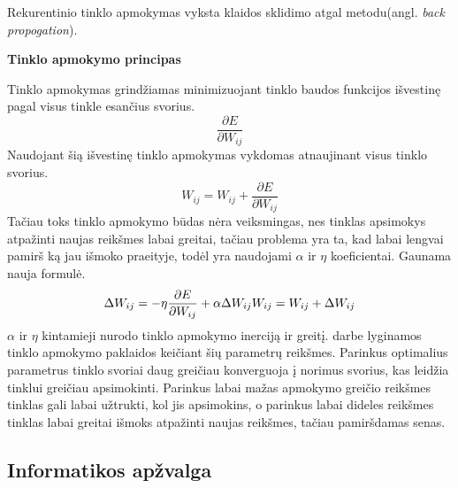 Rekurentinio tinklo apmokymas vyksta klaidos sklidimo atgal metodu(angl. \textit{back propogation}).

\textbf{Tinklo apmokymo principas}

Tinklo apmokymas grindžiamas minimizuojant tinklo baudos funkcijos išvestinę pagal visus tinkle esančius svorius.
    \begin{equation*}
      \frac{\partial E}{\partial W_{ij}}
    \end{equation*}
Naudojant šią išvestinę tinklo apmokymas vykdomas atnaujinant visus tinklo svorius.
    \begin{equation*}
      W_{ij} = W_{ij} + \frac{\partial E}{\partial W_{ij}}
    \end{equation*}
Tačiau toks tinklo apmokymo būdas nėra veiksmingas, nes tinklas apsimokys atpažinti naujas reikšmes labai greitai, tačiau problema yra ta, kad labai lengvai pamirš ką jau išmoko praeityje, todėl yra naudojami $\alpha$ ir $\eta$ koeficientai. Gaunama nauja formulė.
\begin{equation*}
  \Delta W_{ij} =-\eta\frac{\partial E}{\partial W_{ij}}+\alpha \Delta W_{ij} \\
    W_{ij} = W_{ij} + \Delta W_{ij}
\end{equation*}
$\alpha$ ir $\eta$ kintamieji nurodo tinklo apmokymo inerciją ir greitį. \cite{Deividas2018} darbe lyginamos tinklo apmokymo paklaidos keičiant šių parametrų reikšmes. Parinkus optimalius parametrus tinklo svoriai daug greičiau konverguoja į norimus svorius, kas leidžia tinklui greičiau apsimokinti. Parinkus labai mažas apmokymo greičio reikšmes tinklas gali labai užtrukti, kol jis apsimokins, o parinkus labai dideles reikšmes tinklas labai greitai išmoks atpažinti naujas reikšmes, tačiau pamiršdamas senas.


\subsection{ Informatikos apžvalga}



%
%
%
%
%
%
%
%
%
%
%
%
%
%
%
%
%


%
%
%
%
%
%
%
%
%
%
